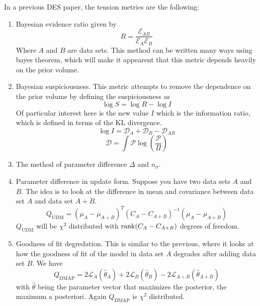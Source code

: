 In a previous DES paper, the tension metrics are the following:
\begin{enumerate}
    \item Bayesian evidence ratio given by
	\begin{equation}
		R = \frac{\mathcal{E}_{AB}}{\mathcal{E}_A\mathcal{E}_B}
	\end{equation}
	Where $A$ and $B$ are data sets. This method can be written many ways using bayes theorem, which will make it appearent that this metric depends heavily on the prior volume.
    \item Bayesian suspiciousness. This metric attempts to remove the dependence on the prior volume by defining the suspiciousness as 
	\begin{equation}
		\log S = \log R - \log I
	\end{equation}
	Of particular interest here is the new value $I$ which is the information ratio, which is defined in terms of the KL divergence.
	\begin{equation}
		\log I = \mathcal{D}_A + \mathcal{D}_B - \mathcal{D}_{AB}
	\end{equation}
	\begin{equation}
		\mathcal{D} = \int \mathcal{P} \log(\frac{\mathcal{P}}{\Pi})
	\end{equation}
    \item The method of parameter difference $\Delta$ and $n_\sigma$.
    \item Parameter difference in update form. Suppose you have two data sets $A$ and $B$. 
    The idea is to look at the difference in mean and covariance between data set $A$ and data set $A+B$.
	\begin{equation}
		Q_{\mathrm{UDM}} = {(\mu_A - \mu_{A+B})}^T{(C_A-C_{A+B})}^{-1}(\mu_A - \mu_{A+B})
	\end{equation}
	$Q_{\mathrm{UDM}}$ will be $\chi^2$ distributed with $\rank(C_A-C_{A+B})$ degrees of freedom.
    \item Goodness of fit degredation. This is similar to the previous, where it looks at how the goodness of fit of the model in data set $A$ degrades after adding data set $B$. We have
	\begin{equation}
		Q_{\mathrm{DMAP}} = 2\mathcal{L}_{A}(\hat{\theta}_A) + 2\mathcal{L}_B(\hat\theta_B) - 2 \mathcal{L}_{A+B}(\hat\theta_{A+B})
	\end{equation}
	with $\hat{\theta}$ being the parameter vector that maximizes the posterior, the maximum a posteriori. Again $Q_{\mathrm{DMAP}}$ is $\chi^2$ distributed. 
\end{enumerate}

